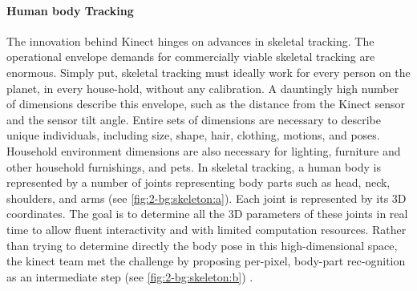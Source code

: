 \paragraph{Human body Tracking}
The innovation behind Kinect hinges on advances in skeletal tracking. The operational envelope demands for commercially viable skeletal tracking are enormous. Simply put, skeletal tracking must ideally work for every person on the planet, in every house-hold, without any calibration. A dauntingly high number of dimensions describe this envelope, such as the distance from the Kinect sensor and the sensor tilt angle. Entire sets of dimensions are necessary to describe unique individuals, including size, shape, hair, clothing, motions, and poses. Household environment dimensions are also necessary for lighting, furniture and other household furnishings, and pets.
In skeletal tracking, a human body is represented by a number of joints representing body parts such as head, neck, shoulders, and arms (see \figurename{\ref{fig:2-bg:skeleton:a}}). Each joint is represented by its 3D coordinates. The goal is to determine all the 3D parameters of these joints in real time to allow fluent interactivity and with limited computation resources. Rather than trying to determine directly the body pose in this high-dimensional space, the kinect team met the challenge by proposing per-pixel, body-part rec-ognition as an intermediate step (see \figurename{\ref{fig:2-bg:skeleton:b}}) \cite{Shotton2011}.
